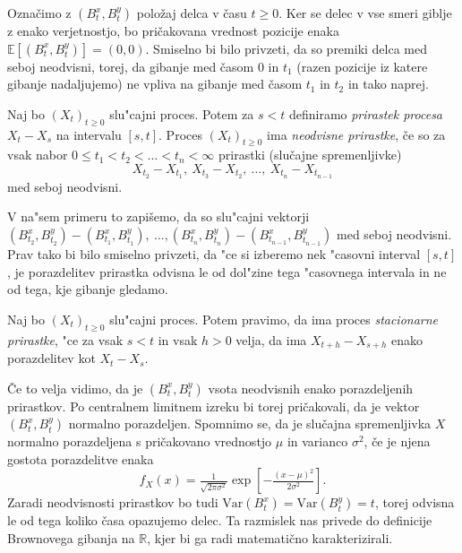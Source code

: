 \documentclass[twoside,11pt]{article}
\begin{document}
\noindent
Označimo z $\left(B^x_{t}, B^y_{t}\right)$ položaj delca v času $t \geq 0$. Ker se delec v vse 
smeri giblje z enako verjetnostjo, bo pričakovana vrednost pozicije enaka $\mathbb{E}\left[(B_t^x, B_t^y)\right] = (0, 0).$
Smiselno bi bilo privzeti, da so premiki delca med seboj neodvisni, torej, 
da gibanje med časom $0$ in $t_1$ (razen pozicije iz katere gibanje nadaljujemo) ne vpliva na gibanje med časom $t_1$ in $t_2$ in tako naprej.

\begin{definicija}
    Naj bo $(X_t)_{t\geq0}$ slu"cajni proces. Potem za $s < t$ definiramo \textit{prirastek procesa} $X_t - X_s$ na 
    intervalu $[s, t]$. Proces $(X_t)_{t\geq0}$ ima \textit{neodvisne prirastke}, če so za vsak nabor 
    $0 \leq t_1 < t_2 < \ldots < t_n < \infty$ prirastki (slučajne spremenljivke)
    $$
        X_{t_2} - X_{t_1}, \ X_{t_3} - X_{t_2}, \ \ldots, \ X_{t_n} - X_{t_{n-1}}
    $$
    med seboj neodvisni.
\end{definicija}

\noindent
V na"sem primeru to zapišemo, da so slu"cajni vektorji $(B^x_{t_2}, B^y_{t_2}) - (B^x_{t_1}, B^y_{t_1}), \ \dots, (B^x_{t_n}, B^y_{t_n}) - (B^x_{t_{n-1}}, B^y_{t_{n-1}})$
med seboj neodvisni. Prav tako bi bilo smiselno privzeti, da "ce si izberemo nek "casovni interval $[s, t]$,
 je porazdelitev prirastka odvisna le od dol"zine tega "casovnega intervala in ne od tega, kje gibanje gledamo. 

\begin{definicija}
    Naj bo $(X_t)_{t\geq0}$ slu"cajni proces. Potem pravimo, da ima proces \textit{stacionarne prirastke}, "ce za vsak $s < t$ in vsak $h > 0$ velja, da ima $X_{t+h} - X_{s+h}$ enako porazdelitev kot $X_t - X_s$.
\end{definicija}

\noindent
Če to velja vidimo, da je $\left(B^x_{t}, B^y_{t}\right)$ vsota neodvisnih enako porazdeljenih prirastkov. Po centralnem 
limitnem izreku bi torej pričakovali, da je vektor $\left(B^x_{t}, B^y_{t}\right)$ normalno porazdeljen.
Spomnimo se, da je slučajna spremenljivka $X$ normalno porazdeljena s pričakovano vrednostjo $\mu$ in varianco $\sigma^2$, če
je njena gostota porazdelitve enaka
$$
    f_X(x) = \tfrac{1}{\sqrt{2\pi\sigma^2}}\exp\left[-\tfrac{(x-\mu)^2}{2\sigma^2}\right].
$$
Zaradi neodvisnosti prirastkov bo tudi $\text{Var}(B_t^x) = \text{Var}(B_t^y) = t$, torej odvisna le od tega koliko časa opazujemo delec.
Ta razmislek nas privede do definicije Brownovega gibanja na $\mathbb{R}$, kjer bi ga radi matematično karakterizirali.
\end{document}
